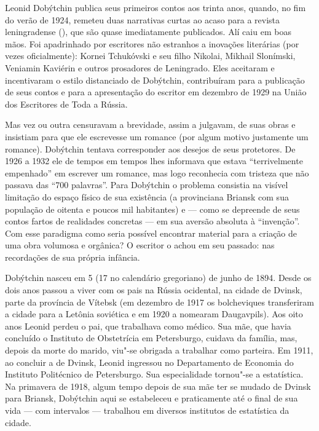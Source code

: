 \begin{multicols}{2}
\baselineskip
\lineskip=1pt
\noindent{}Leonid Dobýtchin publica seus primeiros contos aos trinta anos, quando, no fim do verão de 1924, remeteu duas narrativas curtas ao acaso para a revista leningradense {} ({}), que são quase imediatamente publicados.
Alí caiu em boas mãos. Foi apadrinhado por escritores não
estranhos a inovações literárias (por vezes oficialmente): Kornei
Tchukóvski e seu filho Nikolai, Mikhail Slonímski, Veniamin Kaviérin e
outros prosadores de Leningrado. Eles aceitaram e incentivaram o estilo
distanciado de Dobýtchin, contribuíram para a publicação de seus contos
e para a apresentação do escritor em dezembro de 1929 na União dos
Escritores de Toda a Rússia.

Mas vez ou outra censuravam a brevidade,
assim a julgavam, de suas obras e insistiam para que ele escrevesse um
romance (por algum motivo justamente um romance). Dobýtchin tentava
corresponder aos desejos de seus protetores. De 1926 a 1932 ele de
tempos em tempos lhes informava que estava ``terrivelmente empenhado''
em escrever um romance, mas logo reconhecia com tristeza que não passava
das ``700 palavras''. Para Dobýtchin o problema consistia na visível
limitação do espaço físico de sua existência (a provinciana Briansk com sua população de oitenta e poucos mil habitantes) e
--- como se depreende de seus contos fartos de realidades concretas ---
em sua aversão absoluta à ``invenção''. Com esse paradigma como seria
possível encontrar material para a criação de uma obra volumosa e
orgânica?
O escritor o achou em seu passado: nas recordações de sua própria
infância.

Dobýtchin nasceu em 5 (17 no calendário gregoriano) de junho de 1894. Desde os dois anos passou a
viver com os pais na Rússia ocidental, na cidade de Dvinsk, parte da
província de Vítebsk (em dezembro de 1917 os bolcheviques transferiram a
cidade para a Letônia soviética e em 1920 a nomearam Daugavpils). Aos
oito anos Leonid perdeu o pai, que trabalhava como médico. Sua mãe, que
havia concluído o Instituto de Obstetrícia em Petersburgo, cuidava da
família, mas, depois da morte do marido, viu"-se obrigada a trabalhar
como parteira. Em 1911, ao concluir a {} de Dvinsk,
Leonid ingressou no Departamento de Economia do Instituto Politécnico de
Petersburgo. Sua especialidade tornou"-se a estatística. Na primavera de
1918, algum tempo depois de sua mãe ter se mudado de Dvinsk para
Briansk, Dobýtchin aqui se estabeleceu e praticamente até o final de sua
vida --- com
intervalos --- trabalhou em diversos institutos de estatística
da cidade.


\end{multicols}

